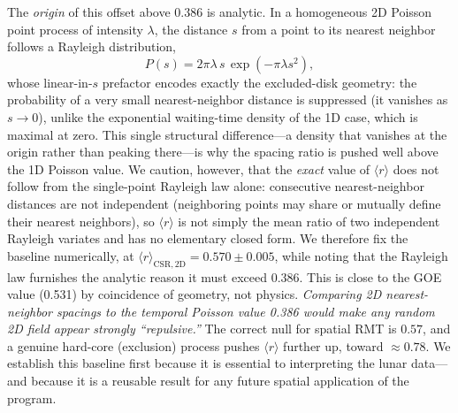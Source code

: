 \documentclass[12pt,a4paper]{article}
\begin{document}
The \emph{origin} of this offset above $0.386$ is analytic. In a homogeneous 2D Poisson point process of intensity $\lambda$, the distance $s$ from a point to its nearest neighbor follows a Rayleigh distribution,
\begin{equation}
P(s) = 2\pi\lambda\,s\,\exp(-\pi\lambda s^2),
\end{equation}
whose linear-in-$s$ prefactor encodes exactly the excluded-disk geometry: the probability of a very small nearest-neighbor distance is suppressed (it vanishes as $s\to0$), unlike the exponential waiting-time density of the 1D case, which is maximal at zero. This single structural difference---a density that vanishes at the origin rather than peaking there---is why the spacing ratio is pushed well above the 1D Poisson value. We caution, however, that the \emph{exact} value of $\langle r\rangle$ does not follow from the single-point Rayleigh law alone: consecutive nearest-neighbor distances are not independent (neighboring points may share or mutually define their nearest neighbors), so $\langle r\rangle$ is not simply the mean ratio of two independent Rayleigh variates and has no elementary closed form. We therefore fix the baseline numerically, at $\langle r\rangle_{\mathrm{CSR,2D}}=0.570\pm0.005$, while noting that the Rayleigh law furnishes the analytic reason it must exceed $0.386$.
This is close to the GOE value (0.531) by coincidence of geometry, not physics. \emph{Comparing 2D nearest-neighbor spacings to the temporal Poisson value 0.386 would make any random 2D field appear strongly ``repulsive.''} The correct null for spatial RMT is $0.57$, and a genuine hard-core (exclusion) process pushes $\langle r\rangle$ further up, toward $\approx0.78$. We establish this baseline first because it is essential to interpreting the lunar data---and because it is a reusable result for any future spatial application of the program.
\end{document}
